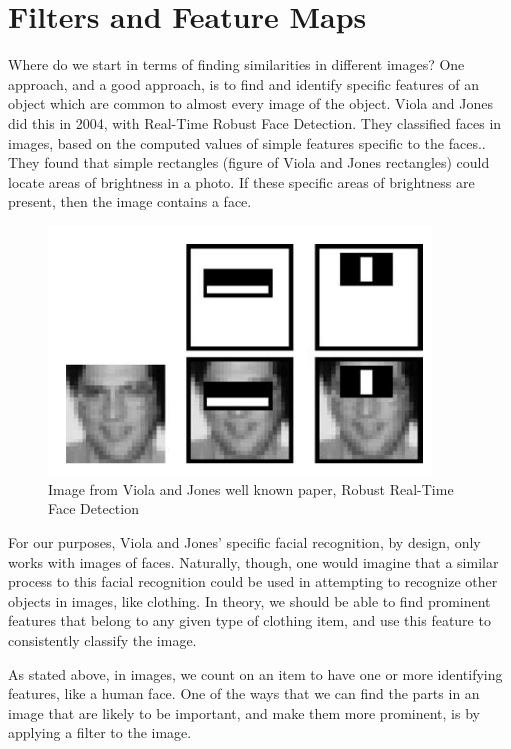 \documentclass[12pt]{report} %
\begin{document}
 \chapter{Filters and Feature Maps}

	Where do we start in terms of finding similarities in different images? One approach, and a good approach, is to find and identify specific features of an object which are common to almost every image of the object. Viola and Jones did this in 2004, with Real-Time Robust Face Detection. They classified faces in images, based on the computed values of simple features specific to the faces.\cite{viola2004robust}. They found that simple rectangles (figure of Viola and Jones rectangles) could locate areas of brightness in a photo. If these specific areas of brightness are present, then the image contains a face. 

\begin{figure}
\centering
\includegraphics[width=4in]{ViolaJonesFace} 
\caption{Image from Viola and Jones well known paper, Robust Real-Time Face Detection\cite{viola2004robust}}
\end{figure}

	For our purposes, Viola and Jones' specific facial recognition, by design, only works with images of faces. Naturally, though, one would imagine that a similar process to this facial recognition could be used in attempting to recognize other objects in images, like clothing. In theory, we should be able to find prominent features that belong to any given type of clothing item, and use this feature to consistently classify the image.
		
	 As stated above, in images, we count on an item to have one or more identifying features, like a human face. One of the ways that we can find the parts in an image that are likely to be important, and make them more prominent, is by applying a filter to the image. 
\end{document}
